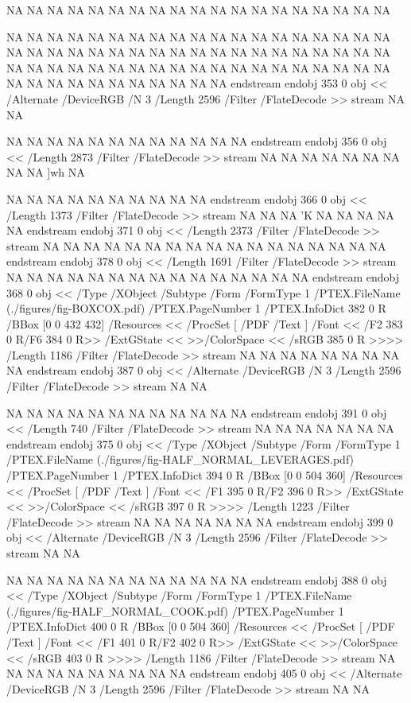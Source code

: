 {NA
NA
NA
NA
NA
NA
NA
NA
NA
NA
NA
NA
NA
NA
NA
NA
NA
NA
NA

NA
NA
NA
NA
NA
NA
NA
NA
NA
NA
NA
NA
NA
NA
NA
NA
NA
NA
NA
NA
NA
NA
NA
NA
NA
NA
NA
NA
NA
NA
NA
NA
NA
NA
NA
NA
NA
NA
NA
NA
NA
NA
NA
NA
NA
NA
NA
NA
NA
NA
NA
NA
NA
NA
NA
NA
NA
NA
NA
NA
NA
NA
NA
NA
NA
NA
NA
NA
endstream
endobj
353 0 obj
<<
/Alternate /DeviceRGB
/N 3
/Length 2596
/Filter /FlateDecode
>>
stream
NA
NA

NA
NA
NA
NA
NA
NA
NA
NA
NA
NA
NA
NA
endstream
endobj
356 0 obj <<
/Length 2873      
/Filter /FlateDecode
>>
stream
NA
NA
NA
NA
NA
NA
NA
NA
NA
]w\h
NA

NA
NA
NA
NA
NA
NA
NA
NA
NA
NA
endstream
endobj
366 0 obj <<
/Length 1373      
/Filter /FlateDecode
>>
stream
NA
NA
NA
 'K
NA
NA
NA
NA
NA
endstream
endobj
371 0 obj <<
/Length 2373      
/Filter /FlateDecode
>>
stream
NA
NA
NA
NA
NA
NA
NA
NA
NA
NA
NA
NA
NA
NA
NA
NA
NA
endstream
endobj
378 0 obj <<
/Length 1691      
/Filter /FlateDecode
>>
stream
NA
NA
NA
NA
NA
NA
NA
NA
NA
NA
NA
NA
NA
NA
NA
endstream
endobj
368 0 obj <<
/Type /XObject
/Subtype /Form
/FormType 1
/PTEX.FileName (./figures/fig-BOXCOX.pdf)
/PTEX.PageNumber 1
/PTEX.InfoDict 382 0 R
/BBox [0 0 432 432]
/Resources <<
/ProcSet [ /PDF /Text ]
/Font << /F2 383 0 R/F6 384 0 R>>
/ExtGState <<
>>/ColorSpace <<
/sRGB 385 0 R
>>>>
/Length 1186
/Filter /FlateDecode
>>
stream
NA
NA
NA
NA
NA
NA
NA
NA
NA
endstream
endobj
387 0 obj
<<
/Alternate /DeviceRGB
/N 3
/Length 2596
/Filter /FlateDecode
>>
stream
NA
NA

NA
NA
NA
NA
NA
NA
NA
NA
NA
NA
NA
NA
endstream
endobj
391 0 obj <<
/Length 740       
/Filter /FlateDecode
>>
stream
NA
NA
NA
NA
NA
NA
NA
endstream
endobj
375 0 obj <<
/Type /XObject
/Subtype /Form
/FormType 1
/PTEX.FileName (./figures/fig-HALF_NORMAL_LEVERAGES.pdf)
/PTEX.PageNumber 1
/PTEX.InfoDict 394 0 R
/BBox [0 0 504 360]
/Resources <<
/ProcSet [ /PDF /Text ]
/Font << /F1 395 0 R/F2 396 0 R>>
/ExtGState <<
>>/ColorSpace <<
/sRGB 397 0 R
>>>>
/Length 1223
/Filter /FlateDecode
>>
stream
NA
NA
NA
NA
NA
NA
NA
endstream
endobj
399 0 obj
<<
/Alternate /DeviceRGB
/N 3
/Length 2596
/Filter /FlateDecode
>>
stream
NA
NA

NA
NA
NA
NA
NA
NA
NA
NA
NA
NA
NA
NA
endstream
endobj
388 0 obj <<
/Type /XObject
/Subtype /Form
/FormType 1
/PTEX.FileName (./figures/fig-HALF_NORMAL_COOK.pdf)
/PTEX.PageNumber 1
/PTEX.InfoDict 400 0 R
/BBox [0 0 504 360]
/Resources <<
/ProcSet [ /PDF /Text ]
/Font << /F1 401 0 R/F2 402 0 R>>
/ExtGState <<
>>/ColorSpace <<
/sRGB 403 0 R
>>>>
/Length 1186
/Filter /FlateDecode
>>
stream
NA
NA
NA
NA
NA
NA
NA
NA
NA
NA
endstream
endobj
405 0 obj
<<
/Alternate /DeviceRGB
/N 3
/Length 2596
/Filter /FlateDecode
>>
stream
NA
NA

}
